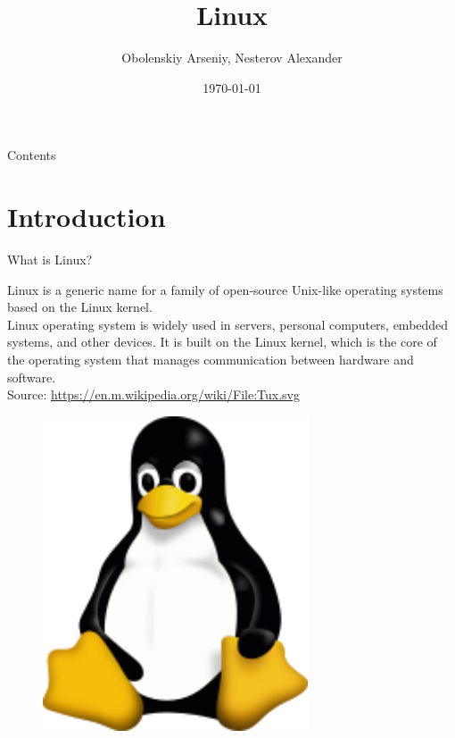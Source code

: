 \documentclass{beamer}
\title[Linux]{Linux}
\author{Obolenskiy Arseniy, Nesterov Alexander}
\institute{ITLab}
\date{\today}
\begin{document}
\begin{frame}
    \titlepage
\end{frame}

\begin{frame}{Contents}
    \tableofcontents
\end{frame}

\section{Introduction}


\begin{frame}{What is Linux?}
  \begin{minipage}[t]{0.6\textwidth}
    Linux is a generic name for a family of open-source Unix-like operating systems based on the Linux kernel. \\
    Linux operating system is widely used in servers, personal computers, embedded systems, and other devices. It is built on the Linux kernel, which is the core of the operating system that manages communication between hardware and software.
    \vspace{10pt}
    \\
    \footnotesize Source: \href{https://en.m.wikipedia.org/wiki/File:Tux.svg}{https://en.m.wikipedia.org/wiki/File:Tux.svg}
  \end{minipage}
  \hfill
  \begin{minipage}[t]{0.35\textwidth}
    \begin{figure}[h]
      \includegraphics[width=0.7\textwidth]{images/tux.png}
    \end{figure}
  \end{minipage}
\end{frame}
\end{document}
